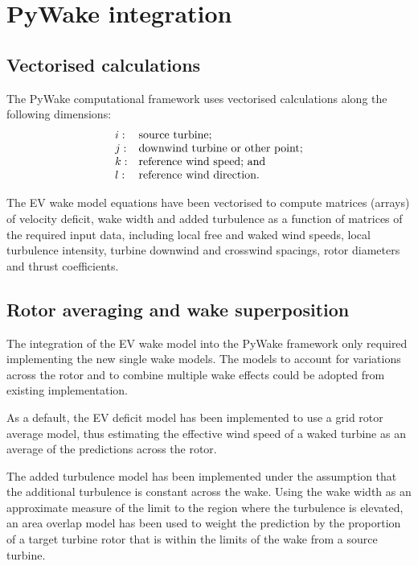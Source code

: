 \documentclass[11pt,a4paper]{article}
\begin{document}
\section{PyWake integration}\label{pywake_integration}

\subsection{Vectorised calculations}\label{vectorised_calculations}

The PyWake computational framework uses vectorised calculations along the following dimensions:
\begin{equation}\label{eq:pywake_indices}
\begin{array}{ l l }
  i: & \textrm{source turbine;}\\
  j: & \textrm{downwind turbine or other point;}\\
  k: & \textrm{reference wind speed; and}\\
  l: & \textrm{reference wind direction.}
\end{array}
\end{equation}

The EV wake model equations have been vectorised to compute matrices (arrays) of velocity deficit, wake width and added turbulence as a function of matrices of the required input data, including local free and waked wind speeds, local turbulence intensity, turbine downwind and crosswind spacings, rotor diameters and thrust coefficients.

\subsection{Rotor averaging and wake superposition}\label{rotor_averaging_and_wake_superposition}

The integration of the EV wake model into the PyWake framework only required implementing the new single wake models. The models to account for variations across the rotor and to combine multiple wake effects could be adopted from existing implementation.

As a default, the EV deficit model has been implemented to use a grid rotor average model, thus estimating the effective wind speed of a waked turbine as an average of the predictions across the rotor.

The added turbulence model has been implemented under the assumption that the additional turbulence is constant across the wake. Using the wake width as an approximate measure of the limit to the region where the turbulence is elevated, an area overlap model has been used to weight the prediction by the proportion of a target turbine rotor that is within the limits of the wake from a source turbine.
\end{document}
